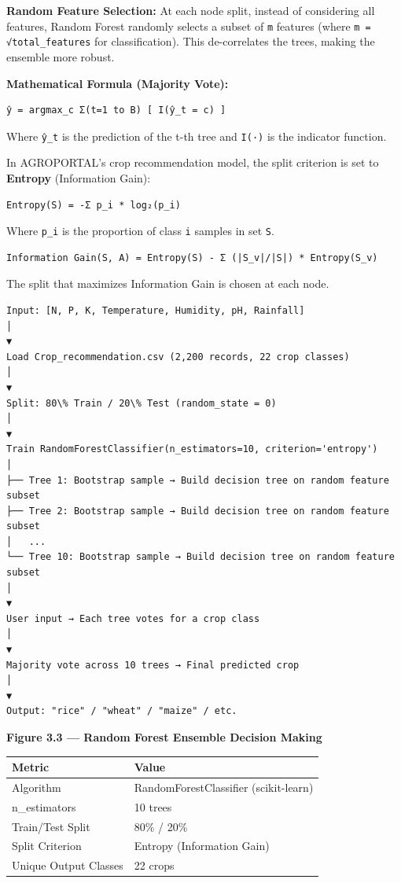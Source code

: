 \documentclass[12pt,a4paper]{report}
\begin{document}
\textbf{Random Feature Selection:} At each node split, instead of considering all features, Random Forest randomly selects a subset of \texttt{m} features (where \texttt{m = √total\_features} for classification). This de-correlates the trees, making the ensemble more robust.

\textbf{Mathematical Formula (Majority Vote):}

\begin{verbatim}
ŷ = argmax_c Σ(t=1 to B) [ I(ŷ_t = c) ]
\end{verbatim}

Where \texttt{ŷ\_t} is the prediction of the t-th tree and \texttt{I(·)} is the indicator function.


In AGROPORTAL's crop recommendation model, the split criterion is set to \textbf{Entropy} (Information Gain):

\begin{verbatim}
Entropy(S) = -Σ p_i * log₂(p_i)
\end{verbatim}

Where \texttt{p\_i} is the proportion of class \texttt{i} samples in set \texttt{S}.

\begin{verbatim}
Information Gain(S, A) = Entropy(S) - Σ (|S_v|/|S|) * Entropy(S_v)
\end{verbatim}

The split that maximizes Information Gain is chosen at each node.


\begin{verbatim}
Input: [N, P, K, Temperature, Humidity, pH, Rainfall]
│
▼
Load Crop_recommendation.csv (2,200 records, 22 crop classes)
│
▼
Split: 80\% Train / 20\% Test (random_state = 0)
│
▼
Train RandomForestClassifier(n_estimators=10, criterion='entropy')
│
├── Tree 1: Bootstrap sample → Build decision tree on random feature subset
├── Tree 2: Bootstrap sample → Build decision tree on random feature subset
│   ...
└── Tree 10: Bootstrap sample → Build decision tree on random feature subset
│
▼
User input → Each tree votes for a crop class
│
▼
Majority vote across 10 trees → Final predicted crop
│
▼
Output: "rice" / "wheat" / "maize" / etc.
\end{verbatim}

\textbf{Figure 3.3 — Random Forest Ensemble Decision Making}


\begin{table}[h!]
\centering
\begin{tabular}{|l|l|}
\hline
Metric & Value \\ \hline
Algorithm & RandomForestClassifier (scikit-learn) \\ \hline
n\_estimators & 10 trees \\ \hline
Train/Test Split & 80\% / 20\% \\ \hline
Split Criterion & Entropy (Information Gain) \\ \hline
Unique Output Classes & 22 crops \\ \hline
\end{tabular}
\end{table}
\end{document}
